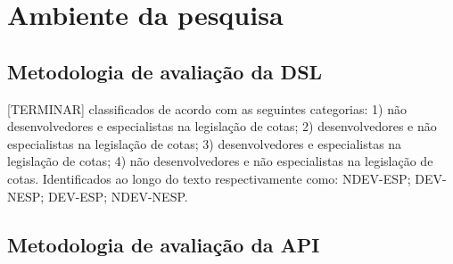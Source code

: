 \section{Ambiente da pesquisa}
\label{ambiente}

\subsection{Metodologia de avaliação da DSL}
\label{metododsl}

 [TERMINAR] classificados de acordo com as seguintes categorias: 1) não desenvolvedores e especialistas na legislação de cotas; 2) desenvolvedores e não especialistas na legislação de cotas; 3) desenvolvedores e especialistas na legislação de cotas; 4) não desenvolvedores e não especialistas na legislação de cotas. Identificados ao longo do texto respectivamente como: NDEV-ESP; DEV-NESP; DEV-ESP; NDEV-NESP. 

\subsection{Metodologia de avaliação da API}
\label{metodoapi}